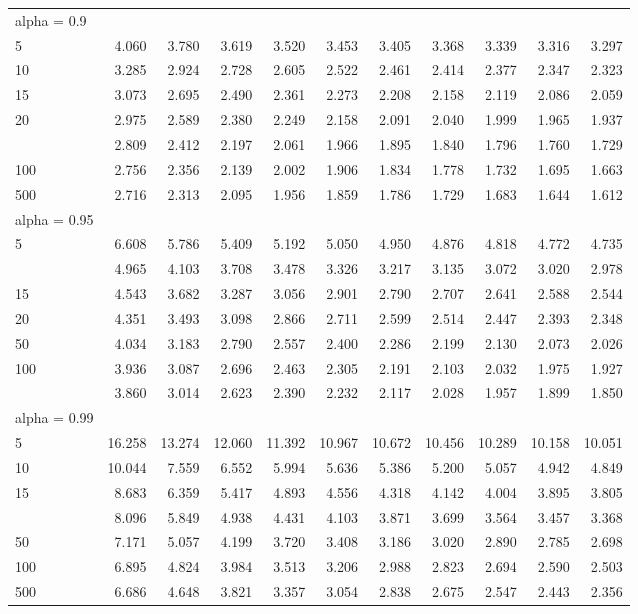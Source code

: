 \documentclass[
  11pt,
]{book}
\theoremstyle{definition}
\theoremstyle{definition}
\theoremstyle{definition}
\theoremstyle{definition}
\theoremstyle{remark}
\begin{document}
\begin{longtable}[t]{lrrrrrrrrrr}
\endfoot
\bottomrule
\endlastfoot
alpha = 0.9 &  &  &  &  &  &  &  &  &  & \\
5 & 4.060 & 3.780 & 3.619 & 3.520 & 3.453 & 3.405 & 3.368 & 3.339 & 3.316 & 3.297\\
10 & 3.285 & 2.924 & 2.728 & 2.605 & 2.522 & 2.461 & 2.414 & 2.377 & 2.347 & 2.323\\
15 & 3.073 & 2.695 & 2.490 & 2.361 & 2.273 & 2.208 & 2.158 & 2.119 & 2.086 & 2.059\\
20 & 2.975 & 2.589 & 2.380 & 2.249 & 2.158 & 2.091 & 2.040 & 1.999 & 1.965 & 1.937\\
\addlinespace
50 & 2.809 & 2.412 & 2.197 & 2.061 & 1.966 & 1.895 & 1.840 & 1.796 & 1.760 & 1.729\\
100 & 2.756 & 2.356 & 2.139 & 2.002 & 1.906 & 1.834 & 1.778 & 1.732 & 1.695 & 1.663\\
500 & 2.716 & 2.313 & 2.095 & 1.956 & 1.859 & 1.786 & 1.729 & 1.683 & 1.644 & 1.612\\
alpha = 0.95 &  &  &  &  &  &  &  &  &  & \\
5 & 6.608 & 5.786 & 5.409 & 5.192 & 5.050 & 4.950 & 4.876 & 4.818 & 4.772 & 4.735\\
\addlinespace
10 & 4.965 & 4.103 & 3.708 & 3.478 & 3.326 & 3.217 & 3.135 & 3.072 & 3.020 & 2.978\\
15 & 4.543 & 3.682 & 3.287 & 3.056 & 2.901 & 2.790 & 2.707 & 2.641 & 2.588 & 2.544\\
20 & 4.351 & 3.493 & 3.098 & 2.866 & 2.711 & 2.599 & 2.514 & 2.447 & 2.393 & 2.348\\
50 & 4.034 & 3.183 & 2.790 & 2.557 & 2.400 & 2.286 & 2.199 & 2.130 & 2.073 & 2.026\\
100 & 3.936 & 3.087 & 2.696 & 2.463 & 2.305 & 2.191 & 2.103 & 2.032 & 1.975 & 1.927\\
\addlinespace
500 & 3.860 & 3.014 & 2.623 & 2.390 & 2.232 & 2.117 & 2.028 & 1.957 & 1.899 & 1.850\\
alpha = 0.99 &  &  &  &  &  &  &  &  &  & \\
5 & 16.258 & 13.274 & 12.060 & 11.392 & 10.967 & 10.672 & 10.456 & 10.289 & 10.158 & 10.051\\
10 & 10.044 & 7.559 & 6.552 & 5.994 & 5.636 & 5.386 & 5.200 & 5.057 & 4.942 & 4.849\\
15 & 8.683 & 6.359 & 5.417 & 4.893 & 4.556 & 4.318 & 4.142 & 4.004 & 3.895 & 3.805\\
\addlinespace
20 & 8.096 & 5.849 & 4.938 & 4.431 & 4.103 & 3.871 & 3.699 & 3.564 & 3.457 & 3.368\\
50 & 7.171 & 5.057 & 4.199 & 3.720 & 3.408 & 3.186 & 3.020 & 2.890 & 2.785 & 2.698\\
100 & 6.895 & 4.824 & 3.984 & 3.513 & 3.206 & 2.988 & 2.823 & 2.694 & 2.590 & 2.503\\
500 & 6.686 & 4.648 & 3.821 & 3.357 & 3.054 & 2.838 & 2.675 & 2.547 & 2.443 & 2.356\\*
\end{longtable}
\endgroup{}
\end{document}
